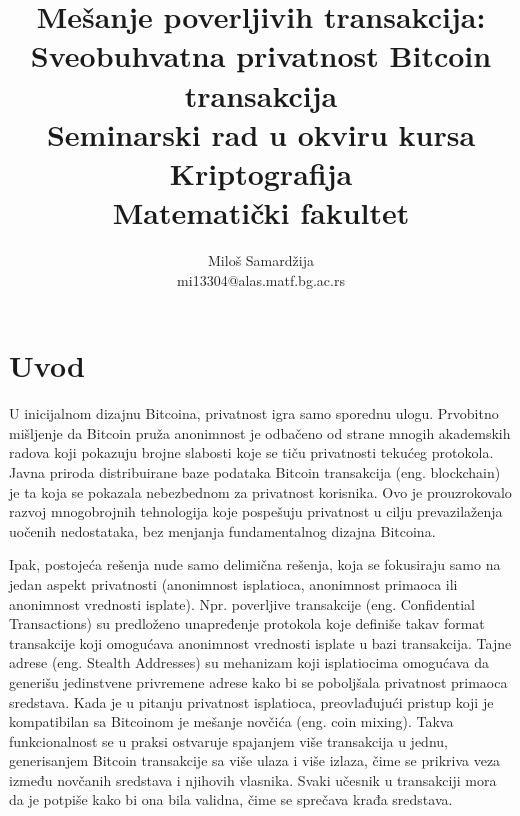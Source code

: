 \documentclass[a4paper]{article}
\begin{document}
\title{Mešanje poverljivih transakcija: Sveobuhvatna privatnost Bitcoin transakcija\\ \small{Seminarski rad u okviru kursa\\Kriptografija\\ Matematički fakultet}}

\author{Miloš Samardžija\\mi13304@alas.matf.bg.ac.rs}

\maketitle

\tableofcontents

\newpage

\section{Uvod}
\label{sec:uvod}
U inicijalnom dizajnu Bitcoina, privatnost igra samo sporednu ulogu. Prvobitno mišljenje da Bitcoin pruža anonimnost je odbačeno od strane mnogih akademskih radova koji pokazuju brojne slabosti koje se tiču privatnosti tekućeg protokola. Javna priroda distribuirane baze podataka Bitcoin transakcija (eng. blockchain) je ta koja se pokazala nebezbednom za privatnost korisnika. Ovo je prouzrokovalo razvoj mnogobrojnih tehnologija koje pospešuju privatnost u cilju prevazilaženja uočenih nedostataka, bez menjanja fundamentalnog dizajna Bitcoina.

Ipak, postojeća rešenja nude samo delimična rešenja, koja se fokusiraju samo na jedan aspekt privatnosti (anonimnost isplatioca, anonimnost primaoca ili anonimnost vrednosti isplate). Npr. poverljive transakcije (eng. Confidential Transactions) su predloženo unapređenje protokola koje definiše takav format transakcije koji omogućava anonimnost vrednosti isplate u bazi transakcija. Tajne adrese (eng. Stealth Addresses) su mehanizam koji isplatiocima omogućava da generišu jedinstvene privremene adrese kako bi se poboljšala privatnost primaoca sredstava. Kada je u pitanju privatnost isplatioca, preovlađujući pristup koji je kompatibilan sa Bitcoinom je mešanje novčića (eng. coin mixing). Takva funkcionalnost se u praksi ostvaruje spajanjem više transakcija u jednu, generisanjem Bitcoin transakcije sa više ulaza i više izlaza, čime se prikriva veza između novčanih sredstava i njihovih vlasnika. Svaki učesnik u transakciji mora da je potpiše kako bi ona bila validna, čime se sprečava krađa sredstava.
\end{document}
